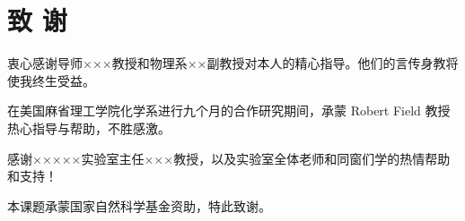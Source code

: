 
%

\newpage
{}
\section*{致 \hspace{0.45em} 谢}

  衷心感谢导师×××教授和物理系××副教授对本人的精心指导。他们的言传身教将使我终生受益。

  在美国麻省理工学院化学系进行九个月的合作研究期间，承蒙 Robert Field 教授热心指导与帮助，不胜感激。

  感谢×××××实验室主任×××教授，以及实验室全体老师和同窗们学的热情帮助和支持！

  本课题承蒙国家自然科学基金资助，特此致谢。


\clearpage


%

